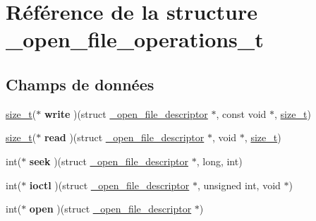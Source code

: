 \hypertarget{struct__open__file__operations__t}{\section{\-Référence de la structure \-\_\-open\-\_\-file\-\_\-operations\-\_\-t}
\label{struct__open__file__operations__t}
}
\subsection*{\-Champs de données}
\begin{DoxyCompactItemize}
\item 
\hypertarget{struct__open__file__operations__t_a8fd3ceb02ffc1f1e0c7123c6827f79c2}{\hyperlink{types_8h_a29d85914ddff32967d85ada69854206d}{size\-\_\-t}($\ast$ {\bfseries write} )(struct \hyperlink{struct__open__file__descriptor}{\-\_\-open\-\_\-file\-\_\-descriptor} $\ast$, const void $\ast$, \hyperlink{types_8h_a29d85914ddff32967d85ada69854206d}{size\-\_\-t})}\label{struct__open__file__operations__t_a8fd3ceb02ffc1f1e0c7123c6827f79c2}

\item 
\hypertarget{struct__open__file__operations__t_abeef0438fc2a1902a33c94bcf9751dac}{\hyperlink{types_8h_a29d85914ddff32967d85ada69854206d}{size\-\_\-t}($\ast$ {\bfseries read} )(struct \hyperlink{struct__open__file__descriptor}{\-\_\-open\-\_\-file\-\_\-descriptor} $\ast$, void $\ast$, \hyperlink{types_8h_a29d85914ddff32967d85ada69854206d}{size\-\_\-t})}\label{struct__open__file__operations__t_abeef0438fc2a1902a33c94bcf9751dac}

\item 
\hypertarget{struct__open__file__operations__t_ac45e5e3400e4cd9756b5784289744cc7}{int($\ast$ {\bfseries seek} )(struct \hyperlink{struct__open__file__descriptor}{\-\_\-open\-\_\-file\-\_\-descriptor} $\ast$, long, int)}\label{struct__open__file__operations__t_ac45e5e3400e4cd9756b5784289744cc7}

\item 
\hypertarget{struct__open__file__operations__t_ab71efab6158837196ad4fef57565dddc}{int($\ast$ {\bfseries ioctl} )(struct \hyperlink{struct__open__file__descriptor}{\-\_\-open\-\_\-file\-\_\-descriptor} $\ast$, unsigned int, void $\ast$)}\label{struct__open__file__operations__t_ab71efab6158837196ad4fef57565dddc}

\item 
\hypertarget{struct__open__file__operations__t_a22018bcaef028f486c45838ba983c170}{int($\ast$ {\bfseries open} )(struct \hyperlink{struct__open__file__descriptor}{\-\_\-open\-\_\-file\-\_\-descriptor} $\ast$)}\label{struct__open__file__operations__t_a22018bcaef028f486c45838ba983c170}


\end{DoxyCompactItemize}
